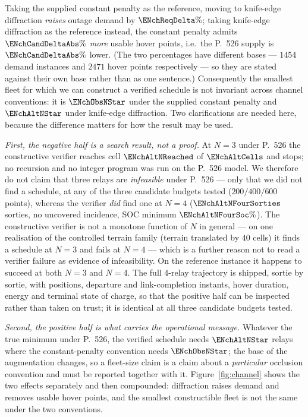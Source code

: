 \documentclass[11pt]{article}
\theoremstyle{dshplain}
\theoremstyle{dshdefn}
\begin{document}
\noindent Taking the supplied constant penalty as the reference, moving to
knife-edge diffraction \emph{raises} outage demand by $\ENchReqDelta\%$; taking
knife-edge diffraction as the reference instead, the constant penalty admits
$\ENchCandDeltaAbs\%$ \emph{more} usable hover points, i.e.\ the P.~526 supply is
$\ENchCandDeltaAbs\%$ lower. (The two percentages have different bases ---
$1454$ demand instances and $2471$ hover points respectively --- so they are
stated against their own base rather than as one sentence.) Consequently the
smallest fleet for which
we can construct a verified schedule is not invariant across channel conventions:
it is $\ENchObsNStar$ under the supplied constant penalty and $\ENchAltNStar$
under knife-edge diffraction. Two clarifications are needed here, because the
difference matters for how the result may be used.

\emph{First, the negative half is a search result, not a proof.} At $N=3$ under
P.~526 the constructive verifier reaches cell $\ENchAltNReached$ of
$\ENchAltCells$ and stops; no recursion and no integer program was run on the
P.~526 model. We therefore do not claim that three relays are \emph{infeasible}
under P.~526 --- only that we did not find a schedule, at any of the three
candidate budgets tested ($200/400/600$ points), whereas the verifier \emph{did}
find one at $N=4$ ($\ENchAltNFourSorties$ sorties, no uncovered incidence, SOC
minimum $\ENchAltNFourSoc\%$). The constructive verifier is not a monotone
function of $N$ in general --- on one realisation of the controlled terrain
family (terrain translated by $40$ cells) it finds a schedule at $N=3$ and
fails at $N=4$ --- which is a further reason not to read a verifier failure as
evidence of infeasibility. On the reference instance it happens to succeed at
both $N=3$ and $N=4$. The full $4$-relay trajectory is shipped, sortie by sortie, with
positions, departure and link-completion instants, hover duration, energy and
terminal state of charge, so that the positive half can be inspected rather than
taken on trust; it is identical at all three candidate budgets tested.

\emph{Second, the positive half is what carries the operational message.}
Whatever the true minimum under P.~526, the verified schedule needs
$\ENchAltNStar$ relays where the constant-penalty convention needs
$\ENchObsNStar$; the base of the augmentation changes, so a fleet-size claim is a
claim about a \emph{particular} occlusion convention and must be reported together
with it. Figure~\ref{fig:channel} shows the two effects separately and then
compounded: diffraction raises demand and removes usable hover points, and the
smallest constructible fleet is not the same under the two conventions.
\end{document}
